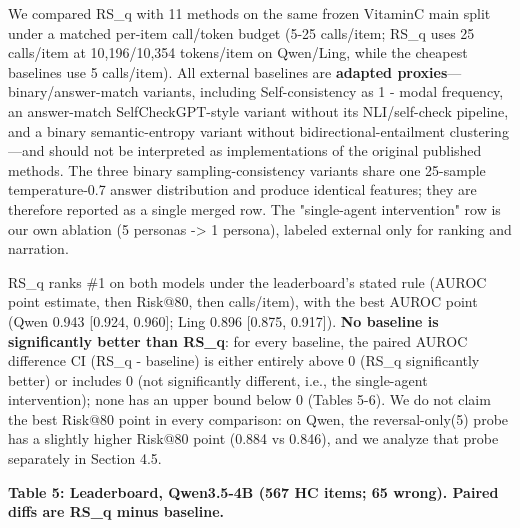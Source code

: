 \documentclass[11pt]{article}
\begin{document}
We compared RS\_q with 11 methods on the same frozen VitaminC main split under a matched per-item call/token budget (5-25 calls/item; RS\_q uses 25 calls/item at 10,196/10,354 tokens/item on Qwen/Ling, while the cheapest baselines use 5 calls/item). All external baselines are \textbf{adapted proxies}—binary/answer-match variants, including Self-consistency as 1 - modal frequency, an answer-match SelfCheckGPT-style variant without its NLI/self-check pipeline, and a binary semantic-entropy variant without bidirectional-entailment clustering—and should not be interpreted as implementations of the original published methods. The three binary sampling-consistency variants share one 25-sample temperature-0.7 answer distribution and produce identical features; they are therefore reported as a single merged row. The "single-agent intervention" row is our own ablation (5 personas -> 1 persona), labeled external only for ranking and narration.

RS\_q ranks \#1 on both models under the leaderboard's stated rule (AUROC point estimate, then Risk@80, then calls/item), with the best AUROC point (Qwen 0.943 [0.924, 0.960]; Ling 0.896 [0.875, 0.917]). \textbf{No baseline is significantly better than RS\_q}: for every baseline, the paired AUROC difference CI (RS\_q - baseline) is either entirely above 0 (RS\_q significantly better) or includes 0 (not significantly different, i.e., the single-agent intervention); none has an upper bound below 0 (Tables 5-6). We do not claim the best Risk@80 point in every comparison: on Qwen, the reversal-only(5) probe has a slightly higher Risk@80 point (0.884 vs 0.846), and we analyze that probe separately in Section 4.5.

\textbf{Table 5: Leaderboard, Qwen3.5-4B (567 HC items; 65 wrong). Paired diffs are RS\_q minus baseline.}
\end{document}
